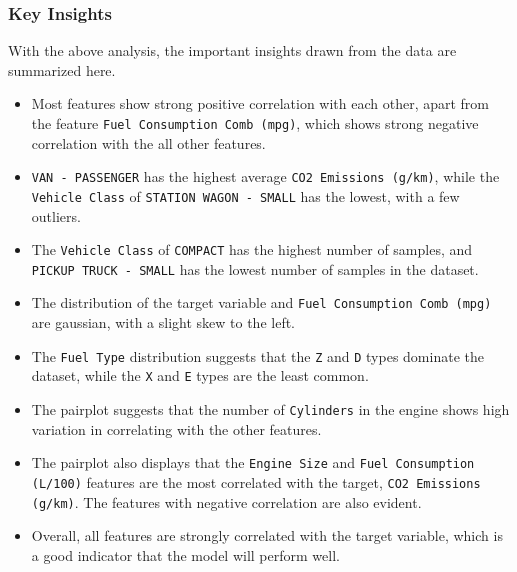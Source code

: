 \documentclass[12pt]{article}
\begin{document}
    \subsubsection*{Key Insights}
    With the above analysis, the important insights drawn from the data are summarized
    here.
    \begin{itemize}
        \item
        Most features show strong positive correlation with each other, apart from the feature \texttt{Fuel Consumption Comb (mpg)},
        which shows strong negative correlation with the all other features.
        \item
        \texttt{VAN - PASSENGER} has the highest average \texttt{CO2 Emissions (g/km)}, while the \texttt{Vehicle Class} of
        \texttt{STATION WAGON - SMALL} has the lowest, with a few outliers.
        \item
        The \texttt{Vehicle Class} of \texttt{COMPACT} has the highest number of samples, and \texttt{PICKUP TRUCK - SMALL}
        has the lowest number of samples in the dataset.
        \item
        The distribution of the target variable and \texttt{Fuel Consumption Comb (mpg)} are gaussian, with a slight skew to the left.
        \item
        The \texttt{Fuel Type} distribution suggests that the \texttt{Z} and \texttt{D} types dominate the dataset, while the
        \texttt{X} and \texttt{E} types are the least common.
        \item
        The pairplot suggests that the number of \texttt{Cylinders} in the engine shows high variation in correlating with the other features.
        \item
        The pairplot also displays that the \texttt{Engine Size} and \texttt{Fuel Consumption (L/100)} features are the most correlated with
        the target, \texttt{CO2 Emissions (g/km)}. The features with negative correlation are also evident.
        \item
        Overall, all features are strongly correlated with the target variable, which is a good indicator that the model will perform well.
    \end{itemize}
\end{document}
